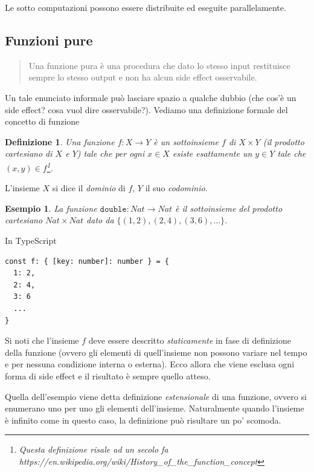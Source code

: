 \documentclass[12pt]{article}
\newtheorem{definition}{Definizione}
\newtheorem{example}{Esempio}
\begin{document}
Le sotto computazioni possono essere distribuite ed eseguite parallelamente.

\subsection{Funzioni pure}

\begin{quote}
Una funzione pura è una procedura che dato lo stesso input restituisce sempre lo stesso output e non ha alcun side effect osservabile.
\end{quote}

Un tale enunciato informale può lasciare spazio a qualche dubbio (che cos'è un side effect? cosa vuol dire osservabile?).
Vediamo una definizione formale del concetto di funzione

\begin{definition}
Una \emph{funzione} $f: X \rightarrow Y$ è un sottoinsieme $f$ di $X \times Y$ (il \emph{prodotto cartesiano} di $X$ e $Y$) tale che
per ogni $x \in X$ esiste esattamente un $y \in Y$ tale che $(x, y) \in f$\footnote{Questa definizione risale ad un secolo fa https://en.wikipedia.org/wiki/History\_of\_the\_function\_concept}.
\end{definition}

L'insieme $X$ si dice il \emph{dominio} di $f$, $Y$ il suo \emph{codominio}.

\begin{example}
La funzione $\texttt{double}: Nat \rightarrow Nat$ è il sottoinsieme del prodotto cartesiano $Nat \times Nat$ dato da $\{ (1, 2), (2, 4), (3, 6), \ldots \}$.
\end{example}

In TypeScript
\begin{verbatim}
const f: { [key: number]: number } = {
  1: 2,
  2: 4,
  3: 6
  ...
}
\end{verbatim}

Si noti che l'insieme $f$ deve essere descritto \emph{staticamente} in fase di definizione della funzione
(ovvero gli elementi di quell'insieme non possono variare nel tempo e per nessuna condizione interna o esterna).
Ecco allora che viene esclusa ogni forma di side effect e il risultato è sempre quello atteso.

Quella dell'esempio viene detta definizione \emph{estensionale} di una funzione, ovvero si enumerano uno per uno gli elementi dell'insieme.
Naturalmente quando l'insieme è infinito come in questo caso, la definizione può risultare un po' scomoda.
\end{document}
